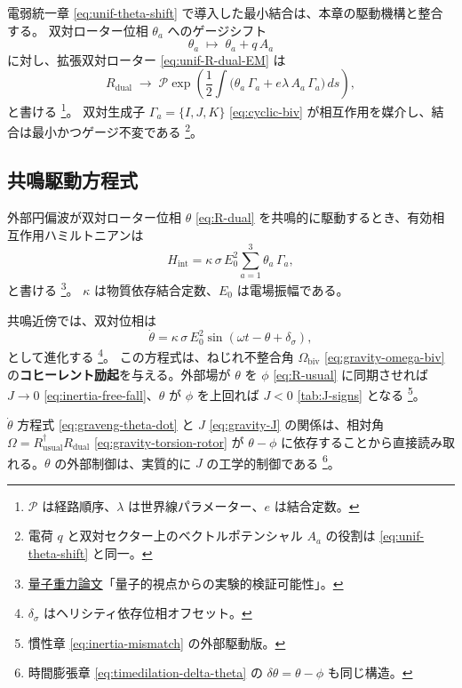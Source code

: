 \documentclass[dvipdfmx,a4paper,oneside]{jsbook}
\numberwithin{equation}{chapter}
\begin{document}
電弱統一章 \eqref{eq:unif-theta-shift} で導入した最小結合は、本章の駆動機構と整合する。
双対ローター位相 \(\theta_a\) へのゲージシフト
\begin{equation}
  \theta_a \;\mapsto\; \theta_a + q\, A_a
  \label{eq:graveng-theta-shift}
\end{equation}
に対し、拡張双対ローター \eqref{eq:unif-R-dual-EM} は
\begin{equation}
  R_{\mathrm{dual}}
  \;\to\;
  \mathcal{P}\exp\!\left(
    \frac{1}{2}\int
    \bigl(\theta_a\,\Gamma_a + e\lambda\, A_a\,\Gamma_a\bigr)\, ds
  \right),
  \label{eq:graveng-R-dual-path}
\end{equation}
と書ける \footnote{\(\mathcal{P}\) は経路順序、\(\lambda\) は世界線パラメーター、\(e\) は結合定数。}。
双対生成子 \(\Gamma_a = \{I, J, K\}\) \eqref{eq:cyclic-biv} が相互作用を媒介し、結合は最小かつゲージ不変である \footnote{電荷 \(q\) と双対セクター上のベクトルポテンシャル \(A_a\) の役割は \eqref{eq:unif-theta-shift} と同一。}。

\subsection{共鳴駆動方程式}

外部円偏波が双対ローター位相 \(\theta\) \eqref{eq:R-dual} を共鳴的に駆動するとき、有効相互作用ハミルトニアンは
\begin{equation}
  H_{\mathrm{int}}
  = \kappa\,\sigma\, E_0^2 \sum_{a=1}^{3} \theta_a\,\Gamma_a,
  \label{eq:graveng-H-int}
\end{equation}
と書ける \footnote{\hyperref[sec:sister-manuscripts]{量子重力論文}「量子的視点からの実験的検証可能性」。}。
\(\kappa\) は物質依存結合定数、\(E_0\) は電場振幅である。

共鳴近傍では、双対位相は
\begin{equation}
  \dot{\theta}
  = \kappa\,\sigma\, E_0^2 \sin(\omega t - \theta + \delta_\sigma),
  \label{eq:graveng-theta-dot}
\end{equation}
として進化する \footnote{\(\delta_\sigma\) はヘリシティ依存位相オフセット。}。
この方程式は、ねじれ不整合角 \(\Omega_{\mathrm{biv}}\) \eqref{eq:gravity-omega-biv} の\textbf{コヒーレント励起}を与える。外部場が \(\theta\) を \(\phi\) \eqref{eq:R-usual} に同期させれば \(J \to 0\) \eqref{eq:inertia-free-fall}、\(\theta\) が \(\phi\) を上回れば \(J < 0\) \eqref{tab:J-signs} となる \footnote{慣性章 \eqref{eq:inertia-mismatch} の外部駆動版。}。

\(\dot{\theta}\) 方程式 \eqref{eq:graveng-theta-dot} と \(J\) \eqref{eq:gravity-J} の関係は、相対角 \(\Omega = R_{\mathrm{usual}}^\dagger R_{\mathrm{dual}}\) \eqref{eq:gravity-torsion-rotor} が \(\theta - \phi\) に依存することから直接読み取れる。\(\theta\) の外部制御は、実質的に \(J\) の工学的制御である \footnote{時間膨張章 \eqref{eq:timedilation-delta-theta} の \(\delta\theta = \theta - \phi\) も同じ構造。}。
\end{document}
